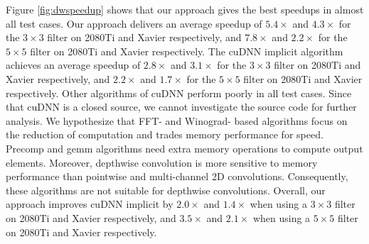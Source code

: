 Figure \ref{fig:dwspeedup} shows that our approach gives the best speedups in almost all test cases. 
Our approach delivers an average speedup of $5.4\times$ and $4.3\times$ for the $3 \times 3$ filter on 2080Ti and Xavier respectively, and $7.8\times$ and $2.2\times$ for the $5 \times 5$ filter on 2080Ti and Xavier respectively.
The cuDNN implicit algorithm achieves an average speedup of $2.8\times$ and $3.1\times$ for the $3 \times 3$ filter on 2080Ti and Xavier respectively, and $2.2\times$ and $1.7\times$ for the $5 \times 5$ filter on 2080Ti and Xavier respectively.
Other algorithms of cuDNN perform poorly in all test cases. 
Since that cuDNN is a closed source, we cannot investigate the source code for further analysis. 
We hypothesize that FFT- and Winograd- based algorithms focus on the reduction of computation and trades memory performance for speed. 
Precomp and gemm algorithms need extra memory operations to compute output elements. 
Moreover, depthwise convolution is more sensitive to memory performance than pointwise and multi-channel 2D convolutions. 
Consequently, these algorithms are not suitable for depthwise convolutions. 
Overall, our approach improves cuDNN implicit by $2.0\times$ and $1.4\times$ when using a $3 \times 3$  filter on 2080Ti and Xavier respectively, and $3.5\times$ and $2.1\times$ when using a $5 \times 5$ filter on 2080Ti and Xavier respectively.
